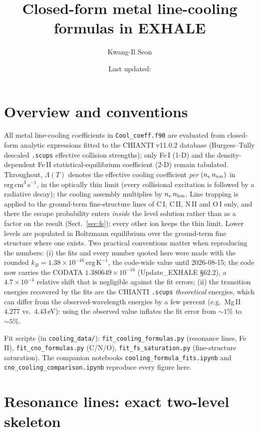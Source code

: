 \documentclass[english,a4paper]{my_memo}
\title{Closed-form metal line-cooling formulas in EXHALE}
\author{Kwang-Il Seon}
\date{Last updated: \docmoddate}
\begin{document}
\maketitle

\section{Overview and conventions}

All metal line-cooling coefficients in \texttt{Cool\_coeff.f90} are
evaluated from closed-form analytic expressions fitted to the CHIANTI
v11.0.2 database (Burgess--Tully descaled \texttt{.scups} effective
collision strengths); only Fe\,I (1-D) and the density-dependent Fe\,II
statistical-equilibrium coefficient (2-D) remain tabulated.  Throughout,
$\Lambda(T)$ denotes the effective cooling coefficient \emph{per}
$(n_e\,n_{\rm ion})$ in $\mathrm{erg\,cm^3\,s^{-1}}$, in the optically
thin limit (every collisional excitation is followed by a radiative
decay); the cooling assembly multiplies by $n_e\,n_{\rm ion}$.  Line
trapping is applied to the ground-term fine-structure lines of C\,I, C\,II,
N\,II and O\,I only, and there the escape probability enters \emph{inside} the
level solution rather than as a factor on the result (Sect.~\ref{sec:fs});
every other ion keeps the thin limit.  Lower levels are populated in
Boltzmann equilibrium over the ground-term fine structure where one
exists.  Two practical conventions matter when reproducing the numbers:
(i) the fits and every number quoted here were made with the rounded
$k_B = 1.38\times10^{-16}\,\mathrm{erg\,K^{-1}}$, the code-wide value
until 2026-08-15; the code now carries the CODATA
$1.380649\times10^{-16}$ (Update\_EXHALE \S62.2), a $4.7\times10^{-4}$
relative shift that is negligible against the fit errors;
(ii) the transition energies recovered by the fits
are the CHIANTI \texttt{.scups} \emph{theoretical} energies, which can
differ from the observed-wavelength energies by a few percent (e.g.\
Mg\,II $4.277$ vs.\ $4.43$\,eV): using the observed value inflates
the fit error from ${\sim}1\%$ to ${\sim}5\%$.

Fit scripts (in \texttt{cooling\_data/}):
\texttt{fit\_cooling\_formulas.py} (resonance lines, Fe\,II),
\texttt{fit\_cno\_formulas.py} (C/N/O),
\texttt{fit\_fs\_saturation.py} (fine-structure saturation).
The companion notebooks \texttt{cooling\_formula\_fits.ipynb} and
\texttt{cno\_cooling\_comparison.ipynb} reproduce every figure here.

\section{Resonance lines: exact two-level skeleton}
\label{sec:resonance}
\end{document}
